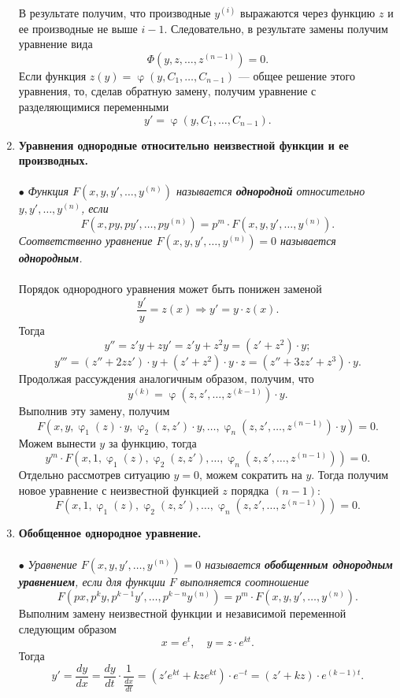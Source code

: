 \documentclass[a4paper, 12pt]{report}
\newcommand{\FI}{\Phi}
\renewcommand{\varphi}{\upvarphi}
\begin{document}
\begin{enumerate}
 В результате получим, что производные $y^{(i)}$ выражаются через функцию $z$ и ее производные не выше $i-1$. Следовательно, в результате замены получим уравнение вида $$\FI(y,z,\ldots, z^{(n-1)}) = 0.$$
 Если функция $z(y) = \varphi(y, C_1,\ldots, C_{n-1})$ --- общее решение этого уравнения, то, сделав обратную замену, получим уравнение с разделяющимися переменными $$y' =  \varphi(y, C_1,\ldots, C_{n-1}).$$
 \item \textbf{Уравнения однородные относительно неизвестной функции и ее производных.}\\\\
 $\bullet$ \textit{Функция $F(x,y,y',\ldots, y^{(n)})$ называется \textbf{однородной} относительно $y,y',\ldots, y^{(n)}$, если $$F(x,py,py',\ldots, py^{(n)}) = p^m\cdot F(x,y,y',\ldots, y^{(n)}).$$ Соответственно уравнение $F(x,y,y',\ldots, y^{(n)}) = 0$ называется \textbf{однородным}.}\\\\
 Порядок однородного уравнения может быть понижен заменой $$\dfrac{y'}{y} = z(x) \Rightarrow y' = y\cdot z(x).$$
 Тогда $$y'' = z'y + zy' = z'y + z^2 y = (z' + z^2)\cdot y;$$
 $$y''' = (z'' + 2zz')\cdot y + (z' + z^2)\cdot y \cdot z = (z'' + 3zz' + z^3)\cdot y.$$
Продолжая рассуждения аналогичным образом, получим, что $$y^{(k)} = \varphi(z,z',\ldots, z^{(k-1)})\cdot y.$$
Выполнив эту замену, получим $$F(x,y,\varphi_1(z)\cdot y, \varphi_2(z,z')\cdot y,\ldots, \varphi_n(z,z',\ldots, z^{(n-1)})\cdot y) = 0.$$
Можем вынести $y$ за функцию, тогда $$y^m\cdot F(x,1, \varphi_1(z), \varphi_2(z,z'),\ldots, \varphi_n(z,z',\ldots, z^{(n-1)})) = 0.$$
Отдельно рассмотрев ситуацию $y= 0 $, можем сократить на $y$. Тогда получим новое уравнение с неизвестной функцией $z$ порядка $(n-1)$:$$F(x,1, \varphi_1(z), \varphi_2(z,z'),\ldots, \varphi_n(z,z',\ldots, z^{(n-1)})) = 0.$$ 
\item \textbf{Обобщенное однородное уравнение.}\\\\
$\bullet$ \textit{Уравнение $F(x, y, y',\ldots, y^{(n)}) = 0$ называется \textbf{обобщенным однородным уравнением}, если для функции $F$ выполняется соотношение} $$F(px, p^ky , p^{k-1}y',\ldots, p^{k-n}y^{(n)}) = p^m\cdot F(x, y, y',\ldots, y^{(n)}).$$
Выполним замену неизвестной функции и независимой переменной следующим образом $$x = e^t,\quad y = z\cdot e^{kt}.$$
Тогда $$y' = \dfrac{dy}{dx} = \dfrac{dy}{dt}\cdot \dfrac{1}{\frac{dx}{dt}} = (z'e^{kt} + k ze^{kt})\cdot e^{-t} = (z' + kz)\cdot e^{(k-1)t}.$$
\begin{multline*}

\end{multline*}
\end{enumerate}
\end{document}

